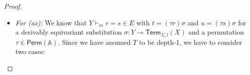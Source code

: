 \documentclass[11pt,a4paper]{amsart}
\newcommand{\Perm}{\mathsf{Perm}(\Names)}
\newcommand{\Term}{\mathsf{Term}}
\newcommand{\sig}{\Sigma}
\newcommand{\sigf}{\Sigma_{\mathsf f}}
\newcommand{\sigb}{\Sigma_{\mathsf b}}
\newcommand{\Names}{\mathbb{A}}
\theoremstyle{plain}
\numberwithin{equation}{section}
\newcommand{\+}[1]{\mathcal{#1}\xspace}
\theoremstyle{definition}
\begin{document}
\begin{proof}
\begin{enumerate}[wide]
\begin{itemize}
                    If \(d(f) = 1\), then we have
                    \begin{align*}
                        &\bar{q}([t]_{1 + n}) \\
                        =~&q([s^n_X(f(t_1, \ldots, t_p))]_1) && \text{definition of } \bar{q} \\
                        =~&q([f([t_1]_n, \ldots, [t_p]_n)]_1) && \text{definition of } s^n_X \\
                        =~&q([f([u_1]_n, \ldots, [u_p]_n)]_1) && \text{assumption} \\
                        =~&q([s^n_X(f(u_1, \ldots, u_p))]_1) && \text{definition of } s^n_X \\
                        =~&\bar{q}([u]_{1 + n}) && \text{definition of } \bar{q}.
                    \end{align*}
                    The cases for $f\in\sigf$ and $f\in\sigb$ are analogous.
                \item
                    \textit{For (ax):}
                    We know that \(Y \vdash_m r = s \in E\) with \(t = (\tau r)\sigma\) and \(u = (\tau s)\sigma\) for a derivably equivariant substitution \(\sigma: Y \to \Term_{\sig, l}(X)\) and a permutation \(\tau \in \Perm\).
                    Since we have assumed \(T\) to be depth-1, we have to consider two cases:


\end{itemize}
\end{enumerate}
\end{proof}
\end{document}
